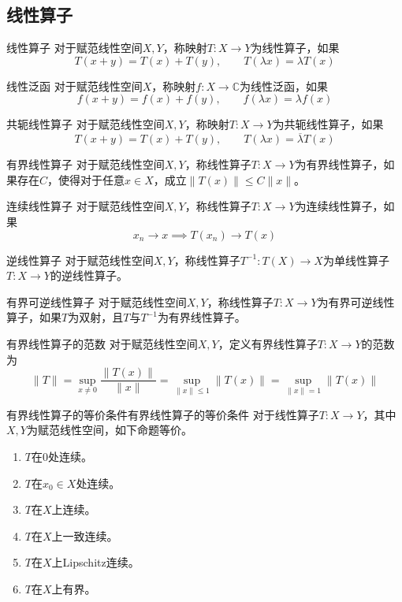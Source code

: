\documentclass[lang = cn, scheme = chinese, thmcnt = section]{elegantbook}
\newcommand{\C}{\mathbb{C}}  		   %
\begin{document}
\subsection{线性算子}

\begin{definition}{线性算子}
	对于赋范线性空间$X,Y$，称映射$T:X\to Y$为线性算子，如果
	$$
	T(x+y)=T(x)+T(y),\qquad T(\lambda x)=\lambda T(x)
	$$
\end{definition}

\begin{definition}{线性泛函}
	对于赋范线性空间$X$，称映射$f:X\to \C$为线性泛函，如果
	$$
	f(x+y)=f(x)+f(y),\qquad f(\lambda x)=\lambda f(x)
	$$
\end{definition}

\begin{definition}{共轭线性算子}
	对于赋范线性空间$X,Y$，称映射$T:X\to Y$为共轭线性算子，如果
	$$
	T(x+y)=T(x)+T(y),\qquad T(\lambda x)=\overline{\lambda} T(x)
	$$
\end{definition}

\begin{definition}{有界线性算子}
	对于赋范线性空间$X,Y$，称线性算子$T:X\to Y$为有界线性算子，如果存在$C$，使得对于任意$x\in X$，成立$\|T(x)\|\le C\|x\|$。
\end{definition}

\begin{definition}{连续线性算子}
	对于赋范线性空间$X,Y$，称线性算子$T:X\to Y$为连续线性算子，如果
	$$
	x_n\to x\implies T(x_n)\to T(x)
	$$
\end{definition}

\begin{definition}{逆线性算子}
	对于赋范线性空间$X,Y$，称线性算子$T^{-1}:T(X)\to X$为单线性算子$T:X\to Y$的逆线性算子。
\end{definition}

\begin{definition}{有界可逆线性算子}
	对于赋范线性空间$X,Y$，称线性算子$T:X\to Y$为有界可逆线性算子，如果$T$为双射，且$T$与$T^{-1}$为有界线性算子。
\end{definition}

\begin{definition}{有界线性算子的范数}
	对于赋范线性空间$X,Y$，定义有界线性算子$T:X\to Y$的范数为
	$$
	\|T\|=\sup_{x\ne 0}\frac{\|T(x)\|}{\|x\|}
	=\sup_{\|x\|\le 1}\|T(x)\|
	=\sup_{\|x\|=1}\|T(x)\|
	$$
\end{definition}

\begin{theorem}{有界线性算子的等价条件}{有界线性算子的等价条件}
	对于线性算子$T:X\to Y$，其中$X,Y$为赋范线性空间，如下命题等价。
	\begin{enumerate}
		\item $T$在$0$处连续。
		\item $T$在$x_0\in X$处连续。
		\item $T$在$X$上连续。
		\item $T$在$X$上一致连续。
		\item $T$在$X$上Lipschitz连续。
		\item $T$在$X$上有界。
	\end{enumerate}
\end{theorem}
\end{document}
